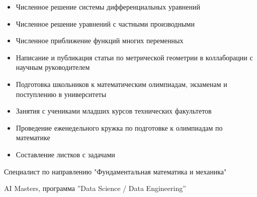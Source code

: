 \documentclass[10pt,a4paper,ragged2e,withhyper]{altacv}
\begin{document}
\begin{paracol}{2}
  \newpage

  \switchcolumn
  \begin{itemize}
    \item Численное решение системы дифференциальных уравнений
    \item Численное решение уравнений с частными производными
    \item Численное приближение функций многих переменных
  \end{itemize}
  \divider

  \begin{itemize}
    \item Написание и публикация статьи по метрической геометрии в
      коллаборации с научным руководителем

  \end{itemize}

  \begin{itemize}
    \item Подготовка школьников к математическим олимпиадам,
      экзаменам и поступлению в университеты
    \item Занятия с учениками младших курсов технических факультетов
  \end{itemize}
  \divider

  \begin{itemize}
    \item Проведение еженедельного кружка по подготовке к олимпиадам
      по математике
    \item Составление листков с задачами
  \end{itemize}

  \vspace{3pt}

  Специалист по направлению "Фундаментальная математика и механика"

  \divider

  AI Masters, программа ''Data Science / Data Engineering''


\end{paracol}
\end{document}
